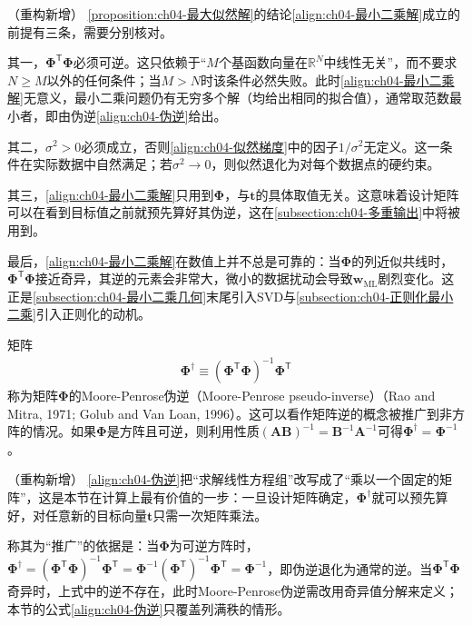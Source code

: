 \documentclass[../../main.tex]{subfiles}
\begin{document}
\begin{remark}（重构新增）
\cref{proposition:ch04-最大似然解}的结论\eqref{align:ch04-最小二乘解}成立的前提有三条，需要分别核对。

其一，$\boldsymbol{\Phi}^{\mathsf{T}}\boldsymbol{\Phi}$必须可逆。这只依赖于“$M$个基函数向量在$\mathbb{R}^N$中线性无关”，而不要求$N\geqslant M$以外的任何条件；当$M>N$时该条件必然失败。此时\eqref{align:ch04-最小二乘解}无意义，最小二乘问题仍有无穷多个解（均给出相同的拟合值），通常取范数最小者，即由伪逆\eqref{align:ch04-伪逆}给出。

其二，$\sigma^2>0$必须成立，否则\eqref{align:ch04-似然梯度}中的因子$1/\sigma^2$无定义。这一条件在实际数据中自然满足；若$\sigma^2\to0$，则似然退化为对每个数据点的硬约束。

其三，\eqref{align:ch04-最小二乘解}只用到$\boldsymbol{\Phi}$，与$\boldsymbol{t}$的具体取值无关。这意味着设计矩阵可以在看到目标值之前就预先算好其伪逆，这在\cref{subsection:ch04-多重输出}中将被用到。

最后，\eqref{align:ch04-最小二乘解}在数值上并不总是可靠的：当$\boldsymbol{\Phi}$的列近似共线时，$\boldsymbol{\Phi}^{\mathsf{T}}\boldsymbol{\Phi}$接近奇异，其逆的元素会非常大，微小的数据扰动会导致$\boldsymbol{w}_{\mathrm{ML}}$剧烈变化。这正是\cref{subsection:ch04-最小二乘几何}末尾引入SVD与\cref{subsection:ch04-正则化最小二乘}引入正则化的动机。
\end{remark}

\begin{definition}\label{definition:ch04-伪逆}
矩阵
\begin{align}
  \boldsymbol{\Phi}^{\dagger}\equiv(\boldsymbol{\Phi}^{\mathsf{T}}\boldsymbol{\Phi})^{-1}\boldsymbol{\Phi}^{\mathsf{T}}
  \label{align:ch04-伪逆}
\end{align}
称为矩阵$\boldsymbol{\Phi}$的Moore-Penrose伪逆（Moore-Penrose pseudo-inverse）（Rao and Mitra, 1971; Golub and Van Loan, 1996）。这可以看作矩阵逆的概念被推广到非方阵的情况。如果$\boldsymbol{\Phi}$是方阵且可逆，则利用性质$(\boldsymbol{A}\boldsymbol{B})^{-1}=\boldsymbol{B}^{-1}\boldsymbol{A}^{-1}$可得$\boldsymbol{\Phi}^{\dagger}=\boldsymbol{\Phi}^{-1}$。
\end{definition}

\begin{remark}（重构新增）
\eqref{align:ch04-伪逆}把“求解线性方程组”改写成了“乘以一个固定的矩阵”，这是本节在计算上最有价值的一步：一旦设计矩阵确定，$\boldsymbol{\Phi}^{\dagger}$就可以预先算好，对任意新的目标向量$\boldsymbol{t}$只需一次矩阵乘法。

称其为“推广”的依据是：当$\boldsymbol{\Phi}$为可逆方阵时，$\boldsymbol{\Phi}^{\dagger}=(\boldsymbol{\Phi}^{\mathsf{T}}\boldsymbol{\Phi})^{-1}\boldsymbol{\Phi}^{\mathsf{T}}=\boldsymbol{\Phi}^{-1}(\boldsymbol{\Phi}^{\mathsf{T}})^{-1}\boldsymbol{\Phi}^{\mathsf{T}}=\boldsymbol{\Phi}^{-1}$，即伪逆退化为通常的逆。当$\boldsymbol{\Phi}^{\mathsf{T}}\boldsymbol{\Phi}$奇异时，上式中的逆不存在，此时Moore-Penrose伪逆需改用奇异值分解来定义；本节的公式\eqref{align:ch04-伪逆}只覆盖列满秩的情形。
\end{remark}
\end{document}
